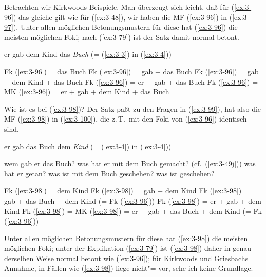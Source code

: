 \documentclass[output=paper]{langsci/langscibook}
\begin{document}
Betrachten wir Kirkwoods Beispiele. Man überzeugt sich leicht, daß für
(\ref{ex:3-96}) das gleiche gilt wie für (\ref{ex:3-48}), \dash wir haben die MF (\ref{ex:3-96}) in
(\ref{ex:3-97}). Unter allen möglichen Betonungsmustern für diese  hat
(\ref{ex:3-96}) die meisten möglichen Foki; nach (\ref{ex:3-79}) ist der Satz damit normal
betont.
\begin{exe}
\ex
\label{ex:3-96}
er gab dem Kind das \textit{Buch} (= (\ref{ex:3-3}) in (\ref{ex:3-4}))
\ex
\label{ex:3-97}
\begin{xlist}
\ex
\label{ex:3-97a}
Fk (\ref{ex:3-96}) = das Buch
\ex
\label{ex:3-97b}
Fk (\ref{ex:3-96}) = gab + das Buch
\ex
\label{ex:3-97c}
Fk (\ref{ex:3-96}) = gab + dem Kind + das Buch
\ex
\label{ex:3-97d}
Fk (\ref{ex:3-96}) = er + gab + das Buch
\ex
\label{ex:3-97e}
Fk (\ref{ex:3-96}) = MK (\ref{ex:3-96}) = er + gab + dem Kind + das Buch
\end{xlist}
\end{exe}
Wie ist es bei (\ref{ex:3-98})? Der Satz paßt zu den Fragen in (\ref{ex:3-99}), hat also die
MF (\ref{ex:3-98}) in (\ref{ex:3-100}), die z.\,T.\ mit den Foki von (\ref{ex:3-96}) identisch sind.
\begin{exe}
\ex
\label{ex:3-98}
er gab das Buch dem \textit{Kind} (= (\ref{ex:3-4}) in (\ref{ex:3-4}))
\ex
\label{ex:3-99}
\begin{xlist}
\ex
\label{ex:3-99a}
wem gab er das Buch?
\ex
\label{ex:3-99b}
was hat er mit dem Buch gemacht? (cf.\ (\ref{ex:3-49j}))
\ex
\label{ex:3-99c}
was hat er getan?
\ex
\label{ex:3-99d}
was ist mit dem Buch geschehen?
\ex
\label{ex:3-99e}
was ist geschehen?
\end{xlist}
\ex
\label{ex:3-100}
\begin{xlist}
\ex
\label{ex:3-100a}
Fk (\ref{ex:3-98}) = dem Kind
\ex
\label{ex:3-100b}
Fk (\ref{ex:3-98}) = gab + dem Kind
\ex
\label{ex:3-100c}
Fk (\ref{ex:3-98}) = gab + das Buch + dem Kind (= Fk (\ref{ex:3-96}))
\ex
\label{ex:3-100d}
Fk (\ref{ex:3-98}) = er + gab + dem Kind
\ex
\label{ex:3-100e}
Fk (\ref{ex:3-98}) = MK (\ref{ex:3-98}) = er + gab + das Buch + dem Kind (= Fk (\ref{ex:3-96}))
\end{xlist}
\end{exe}
Unter allen möglichen Betonungsmustern für diese  hat (\ref{ex:3-98})
die meisten möglichen Foki; unter der Explikation (\ref{ex:3-79}) ist (\ref{ex:3-98}) daher
in genau derselben Weise normal betont wie (\ref{ex:3-96}); für Kirkwoods und
Griesbachs Annahme, in Fällen wie (\ref{ex:3-98}) liege nicht"=
vor, sehe ich keine Grundlage.
\end{document}
